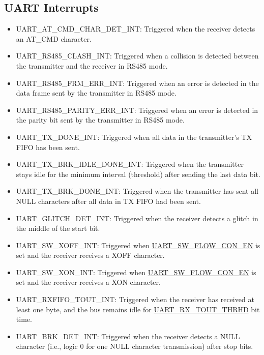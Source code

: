 \documentclass[main\_\_EN.tex]{subfiles}
\begin{document}
\subsection{UART Interrupts}
\begin{itemize}
\item \label{int:UARTATCMDCHARDETINT}UART\_AT\_CMD\_CHAR\_DET\_INT: Triggered when the receiver detects an AT\_CMD character.
\item \label{int:UARTRS485CLASHINT}UART\_RS485\_CLASH\_INT: Triggered when a collision is detected between the transmitter and the receiver in RS485 mode.
\item \label{int:UARTRS485FRMERRINT}UART\_RS485\_FRM\_ERR\_INT: Triggered when an error is detected in the data frame sent by the transmitter in RS485 mode.
\item \label{int:UARTRS485PARITYERRINT}UART\_RS485\_PARITY\_ERR\_INT: Triggered when an error is detected in the parity bit sent by the transmitter in RS485 mode.
\item \label{int:UARTTXDONEINT}UART\_TX\_DONE\_INT: Triggered when all data in the transmitter's TX FIFO has been sent.
\item \label{int:UARTTXBRKIDLEDONEINT}UART\_TX\_BRK\_IDLE\_DONE\_INT: Triggered when the transmitter stays idle for the minimum interval (threshold) after sending the last data bit.
\item \label{int:UARTTXBRKDONEINT}UART\_TX\_BRK\_DONE\_INT: Triggered when the transmitter has sent all NULL characters after all data in TX FIFO had been sent.
\item \label{int:UARTGLITCHDETINT}UART\_GLITCH\_DET\_INT: Triggered when the receiver detects a glitch in the middle of the start bit.
\item \label{int:UARTSWXOFFINT}UART\_SW\_XOFF\_INT: Triggered when \hyperref[fielddesc:UARTSWFLOWCONEN]{UART\_SW\_FLOW\_CON\_EN} is set and the receiver receives a XOFF character.
\item \label{int:UARTSWXONINT}UART\_SW\_XON\_INT: Triggered when \hyperref[fielddesc:UARTSWFLOWCONEN]{UART\_SW\_FLOW\_CON\_EN} is set and the receiver receives a XON character.
\item \label{int:UARTRXFIFOTOUTINT}UART\_RXFIFO\_TOUT\_INT: Triggered when the receiver has received at least one byte, and the bus remains idle for \hyperref[fielddesc:UARTRXTOUTTHRHD]{UART\_RX\_TOUT\_THRHD} bit time.
\item \label{int:UARTBRKDETINT}UART\_BRK\_DET\_INT: Triggered when the receiver detects a NULL character (i.e., logic 0 for one NULL character transmission) after stop bits.

\end{itemize}
\end{document}
